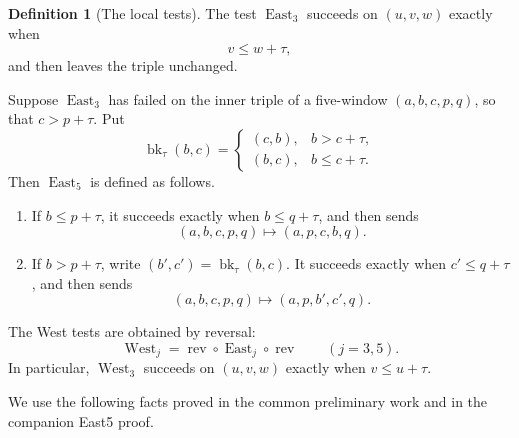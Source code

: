 \documentclass[11pt]{article}
\theoremstyle{definition}
\newtheorem{definition}[theorem]{Definition}
\theoremstyle{remark}
\newcommand{\East}{\operatorname{East}}
\newcommand{\West}{\operatorname{West}}
\newcommand{\rev}{\operatorname{rev}}
\newcommand{\bk}{\operatorname{bk}}
\begin{document}
\begin{definition}[The local tests]
The test $\East_3$ succeeds on $(u,v,w)$ exactly when
\[
 v\le w+\tau,
\]
and then leaves the triple unchanged.

Suppose $\East_3$ has failed on the inner triple of a five-window
$(a,b,c,p,q)$, so that $c>p+\tau$.  Put
\[
 \bk_\tau(b,c)=
 \begin{cases}
  (c,b),&b>c+\tau,\\
  (b,c),&b\le c+\tau.
 \end{cases}
\]
Then $\East_5$ is defined as follows.
\begin{enumerate}[label=\textup{(\alph*)}]
 \item If $b\le p+\tau$, it succeeds exactly when $b\le q+\tau$,
 and then sends
 \[
  (a,b,c,p,q)\longmapsto(a,p,c,b,q).
 \]
 \item If $b>p+\tau$, write $(b',c')=\bk_\tau(b,c)$.  It succeeds
 exactly when $c'\le q+\tau$, and then sends
 \[
  (a,b,c,p,q)\longmapsto(a,p,b',c',q).
 \]
\end{enumerate}
The West tests are obtained by reversal:
\[
 \West_j=\rev\circ\East_j\circ\rev
 \qquad(j=3,5).
\]
In particular, $\West_3$ succeeds on $(u,v,w)$ exactly when
$v\le u+\tau$.
\end{definition}

We use the following facts proved in the common preliminary work and in
the companion East5 proof.
\end{document}
